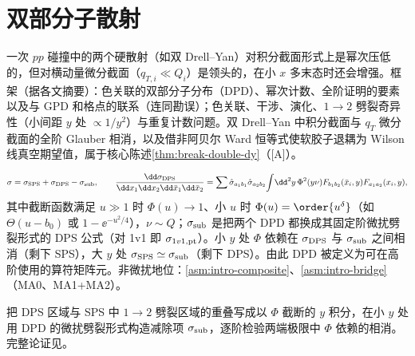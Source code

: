 \section{双部分子散射}\label{sec:front-dps}

一次 $pp$ 碰撞中的两个硬散射（如双 Drell--Yan）对积分截面形式上是幂次压低的，但对横动量微分截面（$q_{T,i}\ll Q_i$）是领头的，在小 $x$ 多末态时还会增强。框架（据各文摘要）：色关联的双部分子分布（DPD）、幂次计数、全阶证明的要素以及与 GPD 和格点的联系\cite{DiehlOstermeierSchafer2012}（连同勘误）；色关联、干涉、演化、$1\to2$ 劈裂奇异性（小间距 $y$ 处 $\propto1/y^2$）与重复计数问题\cite{Manohar:2012jr,Manohar:2012pe}。双 Drell--Yan 中积分截面与 $q_T$ 微分截面的全阶 Glauber 相消\cite{Diehl:2015bca}，以及借非阿贝尔 Ward 恒等式使软胶子退耦为 Wilson 线真空期望值\cite{Diehl:2018wfy}，属于核心陈述\cref{thm:break-double-dy}（[A]）。

\begin{proposition}\label{prop:front-dps-scheme}
\begin{equation}\label{eq:front-dgs}
\sigma=\sigma_{\rm SPS}+\sigma_{\rm DPS}-\sigma_{\rm sub},\qquad
\frac{\dd\sigma_{\rm DPS}}{\dd x_1\dd x_2\dd\bar x_1\dd\bar x_2}=\sum\hat\sigma_{a_1b_1}\hat\sigma_{a_2b_2}\!\int\!\dd^2y\,\Phi^2(y\nu)F_{b_1b_2}(\bar x_i,y)F_{a_1a_2}(x_i,y),
\end{equation}
其中截断函数满足 $u\gg1$ 时 $\Phi(u)\to1$、小 $u$ 时 $\Phi(u)=\order{u^\delta}$（如 $\Theta(u-b_0)$ 或 $1-\ee^{-u^2/4}$），$\nu\sim Q$；$\sigma_{\rm sub}$ 是把两个 DPD 都换成其固定阶微扰劈裂形式的 DPS 公式（对 1v1 即 $\sigma_{1v1,{\rm pt}}$）。小 $y$ 处 $\Phi$ 依赖在 $\sigma_{\rm DPS}$ 与 $\sigma_{\rm sub}$ 之间相消（剩下 SPS），大 $y$ 处 $\sigma_{\rm SPS}\simeq\sigma_{\rm sub}$（剩下 DPS）。由此 DPD 被定义为可在高阶使用的算符矩阵元\cite[第~4.1~节]{Diehl:2017kgu}。非微扰地位：\cref{asm:intro-composite}、\cref{asm:intro-bridge}（MA0、MA1+MA2）。
\end{proposition}

\begin{proofsketch}
把 DPS 区域与 SPS 中 $1\to2$ 劈裂区域的重叠写成以 $\Phi$ 截断的 $y$ 积分，在小 $y$ 处用 DPD 的微扰劈裂形式构造减除项 $\sigma_{\rm sub}$，逐阶检验两端极限中 $\Phi$ 依赖的相消。完整论证见\cite[第~4~节]{Diehl:2017kgu}。
\end{proofsketch}

